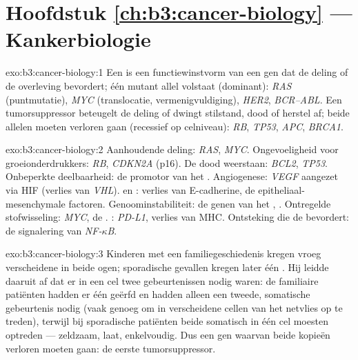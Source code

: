 \section*{Hoofdstuk \ref{ch:b3:cancer-biology} --- Kankerbiologie}

\begin{solution}{exo:b3:cancer-biology:1}
Een  is een functiewinstvorm van een gen dat de deling of de
overleving bevordert; één mutant allel volstaat (dominant):
\emph{RAS} (puntmutatie), \emph{MYC} (translocatie, vermenigvuldiging),
\emph{HER2}, \emph{BCR--ABL}. Een tumorsuppressor beteugelt de deling
of dwingt stilstand, dood of herstel af; beide allelen moeten verloren
gaan (recessief op celniveau): \emph{RB}, \emph{TP53}, \emph{APC},
\emph{BRCA1}.
\end{solution}

\begin{solution}{exo:b3:cancer-biology:2}
Aanhoudende deling: \emph{RAS}, \emph{MYC}. Ongevoeligheid voor
groeionderdrukkers: \emph{RB}, \emph{CDKN2A} (p16). De dood weerstaan:
\emph{BCL2}, \emph{TP53}. Onbeperkte deelbaarheid: de promotor van het
. Angiogenese: \emph{VEGF} aangezet via HIF (verlies van
\emph{VHL}).  en : verlies van E-cadherine, de
epitheliaal-mesenchymale factoren. Genoominstabiliteit: de genen van
het , \emph{}. Ontregelde stofwisseling:
\emph{MYC}, de . : \emph{PD-L1}, verlies van
MHC. Ontsteking die de  bevordert: de signalering van
\emph{NF-$\kappa$B}.
\end{solution}

\begin{solution}{exo:b3:cancer-biology:3}
Kinderen met een familiegeschiedenis kregen vroeg verscheidene 
in beide ogen; sporadische gevallen kregen later één . Hij leidde
daaruit af dat er in een cel twee gebeurtenissen nodig waren: de
familiaire patiënten hadden er één geërfd en hadden alleen een tweede,
somatische gebeurtenis nodig (vaak genoeg om in verscheidene cellen van
het netvlies op te treden), terwijl bij sporadische patiënten beide
somatisch in één cel moesten optreden --- zeldzaam, laat, enkelvoudig.
Dus een gen waarvan beide kopieën verloren moeten gaan: de eerste
tumorsuppressor.
\end{solution}


